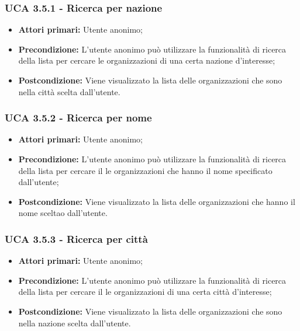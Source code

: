 \subsubsection{UCA 3.5.1 - Ricerca per nazione}%
\begin{itemize}
	\item \textbf{Attori primari:} Utente anonimo;
	\item \textbf{Precondizione:} L'utente anonimo può utilizzare la funzionalità di ricerca della lista per cercare le organizzazioni di una certa nazione d'interesse;
	\item \textbf{Postcondizione:} Viene visualizzato la lista delle organizzazioni che sono nella città scelta dall'utente.
\end{itemize}

\subsubsection{UCA 3.5.2 - Ricerca per nome}%
\begin{itemize}
	\item \textbf{Attori primari:} Utente anonimo;
	\item \textbf{Precondizione:} L'utente anonimo può utilizzare la funzionalità di ricerca della lista per cercare il le organizzazioni che hanno il nome specificato dall'utente;
	\item \textbf{Postcondizione:} Viene visualizzato la lista delle organizzazioni che hanno il nome sceltao dall'utente.
\end{itemize}

\subsubsection{UCA 3.5.3 - Ricerca per città}%
\begin{itemize}
	\item \textbf{Attori primari:} Utente anonimo;
	\item \textbf{Precondizione:} L'utente anonimo può utilizzare la funzionalità di ricerca della lista per cercare il le organizzazioni di una certa città d'interesse;
	\item \textbf{Postcondizione:} Viene visualizzato la lista delle organizzazioni che sono nella nazione scelta dall'utente.
\end{itemize}

